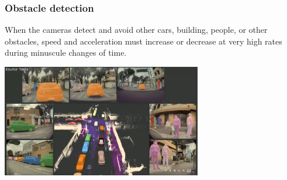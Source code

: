 \documentclass{beamer}
\begin{document}
\begin{frame}
\frametitle{Obstacle detection}




When the cameras detect and avoid other cars, building, people, or other obstacles, speed and acceleration must increase or decrease at very high rates during minuscule changes of time.
\newline



\includegraphics[height=4.9cm,width = \textwidth]{tesla 3.PNG}

\end{frame}
\end{document}
